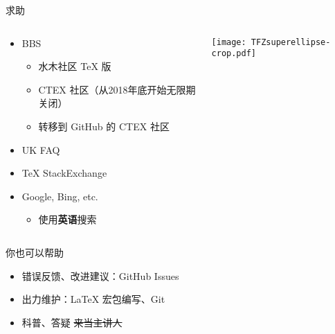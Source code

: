 \begin{frame}{求助}
  \begin{columns}[c]
    \begin{column}{.45\textwidth}
      \begin{itemize}
        \item BBS
          \begin{itemize}
            \item 水木社区 TeX 版 
            \item CTEX 社区（从2018年底开始无限期关闭）
            \item 转移到 GitHub 的 CTEX 社区 
          \end{itemize}
        \item UK FAQ 
        \item TeX StackExchange 
        \item Google, Bing, etc.
          \begin{itemize}
            \item 使用\textbf{英语}搜索
          \end{itemize}
      \end{itemize}
    \end{column}
    \begin{column}{.45\textwidth}
      \texttt{[image: TFZsuperellipse-crop.pdf]}
    \end{column}
  \end{columns}
\end{frame}

\begin{frame}{你也可以帮助}
  \begin{itemize}
    \item 错误反馈、改进建议：GitHub Issues
    \item 出力维护：LaTeX 宏包编写、Git
    \item 科普、答疑 \hspace{2em}\sout{来当主讲人}
  \end{itemize}
\end{frame}

